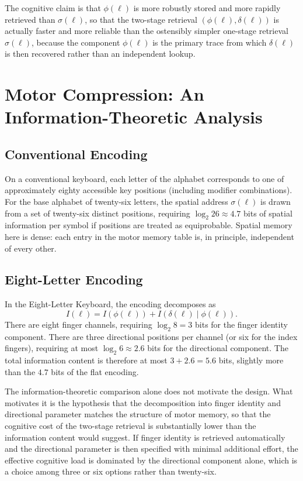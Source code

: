 \documentclass[12pt,a4paper]{article}
\theoremstyle{plain}
\theoremstyle{definition}
\theoremstyle{remark}
\begin{document}
The cognitive claim is that $\phi(\ell)$ is more robustly stored and more
rapidly retrieved than $\sigma(\ell)$, so that the two-stage retrieval
$(\phi(\ell), \delta(\ell))$ is actually faster and more reliable than the
ostensibly simpler one-stage retrieval $\sigma(\ell)$, because the component
$\phi(\ell)$ is the primary trace from which $\delta(\ell)$ is then recovered
rather than an independent lookup.

\section{Motor Compression: An Information-Theoretic Analysis}

\subsection{Conventional Encoding}

On a conventional keyboard, each letter of the alphabet corresponds to one of
approximately eighty accessible key positions (including modifier combinations).
For the base alphabet of twenty-six letters, the spatial address $\sigma(\ell)$
is drawn from a set of twenty-six distinct positions, requiring $\log_2 26
\approx 4.7$ bits of spatial information per symbol if positions are treated as
equiprobable. Spatial memory here is dense: each entry in the motor memory table
is, in principle, independent of every other.

\subsection{Eight-Letter Encoding}

In the Eight-Letter Keyboard, the encoding decomposes as
\[
  I(\ell) = I(\phi(\ell)) + I(\delta(\ell) \mid \phi(\ell)).
\]
There are eight finger channels, requiring $\log_2 8 = 3$ bits for the finger
identity component. There are three directional positions per channel (or six for
the index fingers), requiring at most $\log_2 6 \approx 2.6$ bits for the
directional component. The total information content is therefore at most $3 +
2.6 = 5.6$ bits, slightly more than the $4.7$ bits of the flat encoding.

The information-theoretic comparison alone does not motivate the design. What
motivates it is the hypothesis that the decomposition into finger identity and
directional parameter matches the structure of motor memory, so that the
cognitive cost of the two-stage retrieval is substantially lower than the
information content would suggest. If finger identity is retrieved automatically
and the directional parameter is then specified with minimal additional effort,
the effective cognitive load is dominated by the directional component alone,
which is a choice among three or six options rather than twenty-six.
\end{document}
